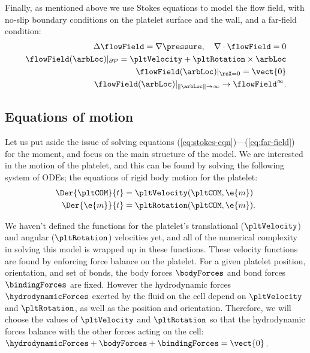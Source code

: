 Finally, as mentioned above we use Stokes equations to model the flow
field, with no-slip boundary conditions on the platelet surface and
the wall, and a far-field condition:
\begin{align}
  \Delta \flowField = \nabla \pressure, \quad \nabla \cdot \flowField
  = 0 \label{eq:stokes-eqn} \\
  \flowField(\arbLoc)|_{\partial\mathcal{P}} = \pltVelocity +
  \pltRotation \times \arbLoc \label{eq:plt-bc} \\
  \flowField(\arbLoc)|_{\rsX = 0} =
  \vect{0} \label{eq:wall-bc} \\
  \flowField(\arbLoc)|_{\|\arbLoc\| \rightarrow \infty}
  \rightarrow \flowField^\infty. \label{eq:far-field}
\end{align}

\subsection{Equations of motion}
\label{sec:equations-motion}

Let us put aside the issue of solving equations
(\ref{eq:stokes-eqn})---(\ref{eq:far-field}) for the moment, and focus
on the main structure of the model. We are interested in the motion of
the platelet, and this can be found by solving the following system of
ODEs; the equations of rigid body motion for the platelet:
\begin{align}
  \Der{\pltCOM}{t} &= \pltVelocity(\pltCOM,
                     \e{m}) \label{eq:plt-velocity} \\
  \Der{\e{m}}{t} &= \pltRotation(\pltCOM,
                   \e{m}). \label{eq:plt-rotation} 
\end{align}

We haven't defined the functions for the platelet's translational
($\pltVelocity$) and angular ($\pltRotation$) velocities yet, and all
of the numerical complexity in solving this model is wrapped up in
these functions. These velocity functions are found by enforcing force
balance on the platelet. For a given platelet position, orientation,
and set of bonds, the body forces $\bodyForces$ and bond forces
$\bindingForces$ are fixed. However the hydrodynamic forces
$\hydrodynamicForces$ exerted by the fluid on the cell depend on
$\pltVelocity$ and $\pltRotation$, as well as the position and
orientation. Therefore, we will choose the values of $\pltVelocity$
and $\pltRotation$ so that the hydrodynamic forces balance with the
other forces acting on the cell: $\hydrodynamicForces + \bodyForces +
\bindingForces = \vect{0}$.

